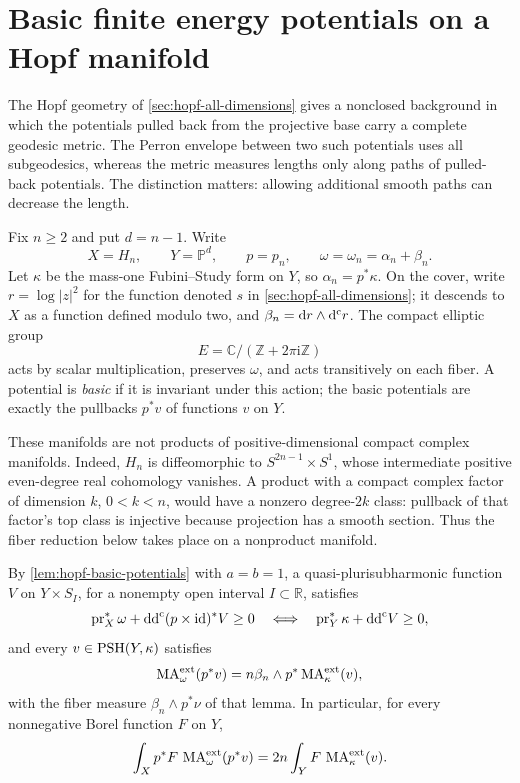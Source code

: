 \section{Basic finite energy potentials on a Hopf manifold}
\label{sec:hopf-basic-perron}

The Hopf geometry of \cref{sec:hopf-all-dimensions} gives a nonclosed background in which the potentials pulled back from the projective base carry a complete geodesic metric. The Perron envelope between two such potentials uses all subgeodesics, whereas the metric measures lengths only along paths of pulled-back potentials. The distinction matters: allowing additional smooth paths can decrease the length.

Fix $n\geq2$ and put $d=n-1$. Write
\[
 X=H_n,\qquad Y=\mathbb P^d,\qquad p=p_n,
 \qquad \omega=\omega_n=\alpha_n+\beta_n.
\]
Let $\kappa$ be the mass-one Fubini--Study form on $Y$, so $\alpha_n=p^*\kappa$. On the cover, write $r=\log|z|^2$ for the function denoted $s$ in \cref{sec:hopf-all-dimensions}; it descends to $X$ as a function defined modulo two, and $\beta_n=\mathrm dr\wedge\mathrm d^{\mathrm c} r$. The compact elliptic group
\[
 E=\mathbb C/(\mathbb Z+2\pi\mathrm i\mathbb Z)
\]
acts by scalar multiplication, preserves $\omega$, and acts transitively on each fiber. A potential is \emph{basic} if it is invariant under this action; the basic potentials are exactly the pullbacks $p^*v$ of functions $v$ on $Y$.

These manifolds are not products of positive-dimensional compact complex manifolds. Indeed, $H_n$ is diffeomorphic to $S^{2n-1}\times S^1$, whose intermediate positive even-degree real cohomology vanishes. A product with a compact complex factor of dimension $k$, $0<k<n$, would have a nonzero degree-$2k$ class: pullback of that factor's top class is injective because projection has a smooth section. Thus the fiber reduction below takes place on a nonproduct manifold.

By \cref{lem:hopf-basic-potentials} with $a=b=1$, a quasi-plurisubharmonic function $V$ on $Y\times S_I$, for a nonempty open interval $I\subset\mathbb R$, satisfies
\[
 \operatorname{pr}_X^*\omega+\mathrm{dd}^{\mathrm{c}}(p\times\mathrm{id})^*V\geq0
 \quad\Longleftrightarrow\quad
 \operatorname{pr}_Y^*\kappa+\mathrm{dd}^{\mathrm{c}} V\geq0,
\]
and every $v\in\mathrm{PSH}(Y,\kappa)$ satisfies
\begin{equation}\label{eq:hopf-basic-measure}
 \operatorname{MA}^{\mathrm{ext}}_\omega(p^*v)
   =n\beta_n\wedge p^*\operatorname{MA}^{\mathrm{ext}}_\kappa(v),
\end{equation}
with the fiber measure $\beta_n\wedge p^*\nu$ of that lemma. In particular, for every nonnegative Borel function $F$ on $Y$,
\begin{equation}\label{eq:hopf-basic-fiber-integral}
 \int_X p^*F\,\operatorname{MA}^{\mathrm{ext}}_\omega(p^*v)
 =2n\int_YF\,\operatorname{MA}^{\mathrm{ext}}_\kappa(v).
\end{equation}

